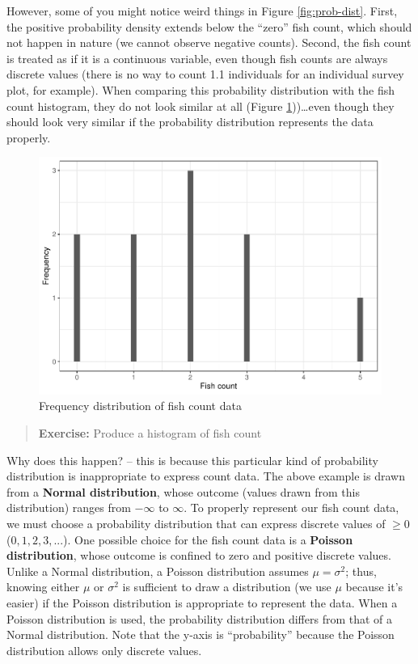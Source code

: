 \documentclass[
]{book}
\begin{document}
However, some of you might notice weird things in Figure \ref{fig:prob-dist}. First, the positive probability density extends below the ``zero'' fish count, which should not happen in nature (we cannot observe negative counts). Second, the fish count is treated as if it is a continuous variable, even though fish counts are always discrete values (there is no way to count 1.1 individuals for an individual survey plot, for example). When comparing this probability distribution with the fish count histogram, they do not look similar at all (Figure \ref{fig:freq-data}))\ldots even though they should look very similar if the probability distribution represents the data properly.

\begin{figure}

{\centering \includegraphics{_main_files/figure-latex/freq-data-1} 

}

\caption{Frequency distribution of fish count data}\label{fig:freq-data}
\end{figure}

\begin{quote}
\textbf{Exercise:} Produce a histogram of fish count
\end{quote}

Why does this happen? -- this is because this particular kind of probability distribution is inappropriate to express count data. The above example is drawn from a \textbf{Normal distribution}, whose outcome (values drawn from this distribution) ranges from \(-\infty\) to \(\infty\). To properly represent our fish count data, we must choose a probability distribution that can express discrete values of \(\ge 0\) (\(0, 1, 2, 3,...\)). One possible choice for the fish count data is a \textbf{Poisson distribution}, whose outcome is confined to zero and positive discrete values. Unlike a Normal distribution, a Poisson distribution assumes \(\mu = \sigma^2\); thus, knowing either \(\mu\) or \(\sigma^2\) is sufficient to draw a distribution (we use \(\mu\) because it's easier) if the Poisson distribution is appropriate to represent the data. When a Poisson distribution is used, the probability distribution differs from that of a Normal distribution. Note that the y-axis is ``probability'' because the Poisson distribution allows only discrete values.
\end{document}
